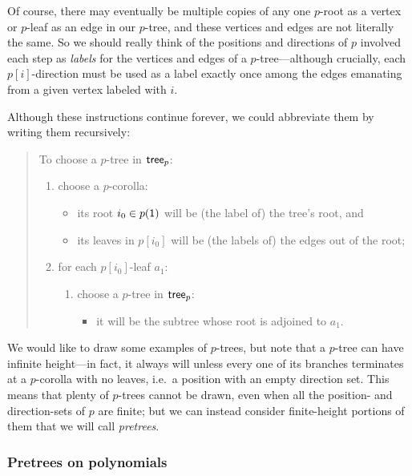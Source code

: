 \documentclass[Book-Poly]{subfiles}
\begin{document}
Of course, there may eventually be multiple copies of any one $p$-root as a vertex or $p$-leaf as an edge in our $p$-tree, and these vertices and edges are not literally the same.
So we should really think of the positions and directions of $p$ involved each step as \emph{labels} for the vertices and edges of a $p$-tree---although crucially, each $p[i]$-direction must be used as a label exactly once among the edges emanating from a given vertex labeled with $i$.

Although these instructions continue forever, we could abbreviate them by writing them recursively:
\begin{quote}
To choose a $p$-tree in $\mathsf{tree}_p$:
\begin{enumerate}
    \item choose a $p$-corolla:
    \begin{itemize}
        \item its root $i_0\in p(\textsf{1})$ will be (the label of) the tree's root, and
        \item its leaves in $p[i_0]$ will be (the labels of) the edges out of the root;
    \end{itemize}
    \item for each $p[i_0]$-leaf $a_1$:
    \begin{enumerate}[label*=\arabic*.]
        \item choose a $p$-tree in $\mathsf{tree}_p$:
        \begin{itemize}
            \item it will be the subtree whose root is adjoined to $a_1$.
        \end{itemize}
    \end{enumerate}
\end{enumerate}
\end{quote}

We would like to draw some examples of $p$-trees, but note that a $p$-tree can have infinite height---in fact, it always will unless every one of its branches terminates at a $p$-corolla with no leaves, i.e.\ a position with an empty direction set.
This means that plenty of $p$-trees cannot be drawn, even when all the position- and direction-sets of $p$ are finite; but we can instead consider finite-height portions of them that we will call \emph{pretrees}.

\subsubsection{Pretrees on polynomials}
\end{document}

